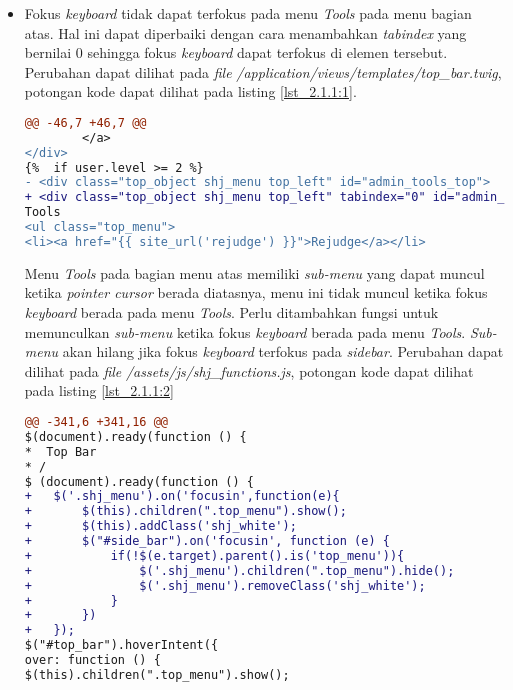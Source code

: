 \begin{itemize}
	\item Fokus \textit{keyboard} tidak dapat terfokus pada menu \textit{Tools} pada menu bagian atas. Hal ini dapat diperbaiki dengan cara menambahkan \textit{tabindex} yang bernilai 0 sehingga fokus \textit{keyboard} dapat terfokus di elemen tersebut. Perubahan dapat dilihat pada \textit{file} \textit{/application/views/templates/top\_bar.twig}, potongan kode dapat dilihat pada listing \ref{lst_2.1.1:1}.
	
\begin{lstlisting}[language=diff, caption=Perubahan pada \textit{file} \textit{top\_bar.twig}, label=lst_2.1.1:1, basicstyle=\ttfamily, frame=single,
columns=fullflexible, keepspaces=true, breaklines=true]
@@ -46,7 +46,7 @@
 		</a>
</div>
{%  if user.level >= 2 %}
- <div class="top_object shj_menu top_left" id="admin_tools_top">
+ <div class="top_object shj_menu top_left" tabindex="0" id="admin_tools_top">
Tools
<ul class="top_menu">
<li><a href="{{ site_url('rejudge') }}">Rejudge</a></li>
\end{lstlisting}
	
	Menu \textit{Tools} pada bagian menu atas memiliki \textit{sub-menu} yang dapat muncul ketika \textit{pointer cursor} berada diatasnya, menu ini tidak muncul ketika fokus \textit{keyboard} berada pada menu \textit{Tools}. Perlu ditambahkan fungsi untuk memunculkan \textit{sub-menu} ketika fokus \textit{keyboard} berada pada menu \textit{Tools}. \textit{Sub-menu} akan hilang jika fokus \textit{keyboard} terfokus pada \textit{sidebar}. Perubahan dapat dilihat pada \textit{file} \textit{/assets/js/shj\_functions.js}, potongan kode dapat dilihat pada listing \ref{lst_2.1.1:2}
	
\begin{lstlisting}[language=diff, caption=Perubahan pada \textit{file} \textit{shj\_functions.js}, label=lst_2.1.1:2, basicstyle=\ttfamily, frame=single,
columns=fullflexible, keepspaces=true, breaklines=true]
@@ -341,6 +341,16 @@ 
$(document).ready(function () {
*  Top Bar
* /
$ (document).ready(function () {
+ 	$('.shj_menu').on('focusin',function(e){
+ 		$(this).children(".top_menu").show();
+ 		$(this).addClass('shj_white');
+ 		$("#side_bar").on('focusin', function (e) {
+ 			if(!$(e.target).parent().is('top_menu')){
+ 				$('.shj_menu').children(".top_menu").hide();
+ 				$('.shj_menu').removeClass('shj_white');
+ 			}
+ 		})
+ 	});
$("#top_bar").hoverIntent({
over: function () {
$(this).children(".top_menu").show();
\end{lstlisting}


\end{itemize}

